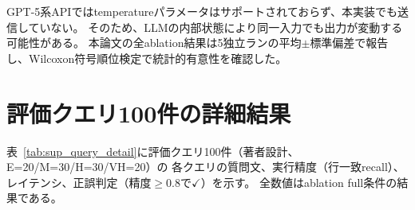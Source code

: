 \documentclass[5p,twocolumn]{elsarticle}
\begin{document}
GPT-5系APIではtemperatureパラメータはサポートされておらず、本実装でも送信していない。
そのため、LLMの内部状態により同一入力でも出力が変動する可能性がある。
本論文の全ablation結果は5独立ランの平均$\pm$標準偏差で報告し、Wilcoxon符号順位検定で統計的有意性を確認した。

\section{評価クエリ100件の詳細結果}
\label{sec:sup_query_detail}

表~\ref{tab:sup_query_detail}に評価クエリ100件（著者設計、E=20/M=30/H=30/VH=20）の
各クエリの質問文、実行精度（行一致recall）、レイテンシ、正誤判定（精度$\geq 0.8$で$\checkmark$）を示す。
全数値はablation full条件の結果である。
\end{document}
